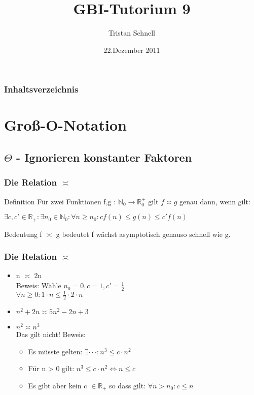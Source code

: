 \documentclass{beamer}
\author{Tristan Schnell}
\title{GBI-Tutorium 9}
\date{22.Dezember 2011}
\begin{document}
\begin {frame}
	\titlepage
\end {frame}

\begin {frame}
	\frametitle {Inhaltsverzeichnis}
	\tableofcontents
\end {frame}

\section{Gro{\ss}-O-Notation} 
\subsection{$\Theta$ - Ignorieren konstanter Faktoren}

\begin{frame}
	\frametitle{Die Relation $\asymp$}
	\begin{block}{Definition}
		F\"ur zwei Funktionen f,g : $ \mathbb N_0 \rightarrow  \mathbb R_0^+$ gilt $f \asymp  g$ genau dann, wenn gilt: \\
		\begin{center}
			$\exists c, c' \in \mathbb R_+ : \exists n_0 \in \mathbb N_0 : \forall n \ge n_0: cf(n) \le g(n) \le c'f(n)$
		\end{center}
	\end{block}

	\begin{block}{Bedeutung}
		f $\asymp$ g bedeutet f w\"achst asymptotisch genauso schnell wie g.
	\end{block}
\end{frame}


\begin{frame}
	\frametitle{Die Relation $\asymp$}
	\begin{example}
		\begin{itemize}
			\item n $\asymp$ 2n \\
				Beweis: W\"ahle $n_0 = 0, c = 1, c' = \frac{1}{2}$ \\
				$\forall n \ge 0 : 1 \cdot n \le \frac{1}{2} \cdot 2 \cdot n$
			\item $n^2 + 2n \asymp 5n^2 -2n +3$
			\item $n^2 \asymp n^3$ \\
				Das gilt nicht! Beweis: \\
			\begin{itemize}
				\item Es m\"usste gelten: $\exists \cdot \cdot \cdot : n^3 \le c \cdot n^2$
				\item F\"ur n > 0 gilt: $n^3 \le c \cdot n^2 \Leftrightarrow n \le c$
				\item Es gibt aber kein c $\in \mathbb R_+$ so dass gilt: $\forall n > n_0 : c \le n$
			\end{itemize}
		\end{itemize}
	\end{example}
\end{frame}
\end{document}
